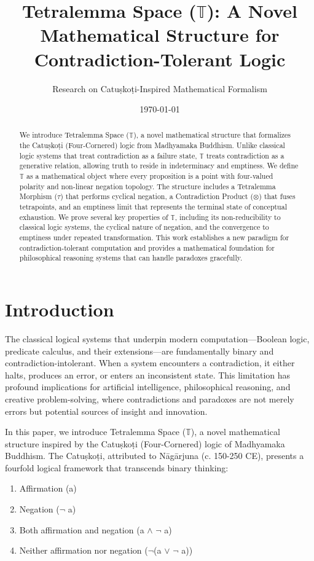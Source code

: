 \documentclass[11pt,a4paper]{article}
\title{Tetralemma Space ($\mathbb{T}$): A Novel Mathematical Structure for Contradiction-Tolerant Logic}
\author{Research on Catuṣkoṭi-Inspired Mathematical Formalism}
\date{\today}
\begin{document}
\maketitle

\begin{abstract}
We introduce Tetralemma Space ($\mathbb{T}$), a novel mathematical structure that formalizes the Catuṣkoṭi (Four-Cornered) logic from Madhyamaka Buddhism. Unlike classical logic systems that treat contradiction as a failure state, $\mathbb{T}$ treats contradiction as a generative relation, allowing truth to reside in indeterminacy and emptiness. We define $\mathbb{T}$ as a mathematical object where every proposition is a point with four-valued polarity and non-linear negation topology. The structure includes a Tetralemma Morphism ($\tau$) that performs cyclical negation, a Contradiction Product ($\otimes$) that fuses tetrapoints, and an emptiness limit that represents the terminal state of conceptual exhaustion. We prove several key properties of $\mathbb{T}$, including its non-reducibility to classical logic systems, the cyclical nature of negation, and the convergence to emptiness under repeated transformation. This work establishes a new paradigm for contradiction-tolerant computation and provides a mathematical foundation for philosophical reasoning systems that can handle paradoxes gracefully.
\end{abstract}

\section{Introduction}

The classical logical systems that underpin modern computation—Boolean logic, predicate calculus, and their extensions—are fundamentally binary and contradiction-intolerant. When a system encounters a contradiction, it either halts, produces an error, or enters an inconsistent state. This limitation has profound implications for artificial intelligence, philosophical reasoning, and creative problem-solving, where contradictions and paradoxes are not merely errors but potential sources of insight and innovation.

In this paper, we introduce Tetralemma Space ($\mathbb{T}$), a novel mathematical structure inspired by the Catuṣkoṭi (Four-Cornered) logic of Madhyamaka Buddhism. The Catuṣkoṭi, attributed to Nāgārjuna (c. 150-250 CE), presents a fourfold logical framework that transcends binary thinking:

\begin{enumerate}
    \item Affirmation (a)
    \item Negation ($\neg$ a)
    \item Both affirmation and negation (a $\wedge$ $\neg$ a)
    \item Neither affirmation nor negation ($\neg$(a $\vee$ $\neg$ a))
\end{enumerate}
\end{document}

